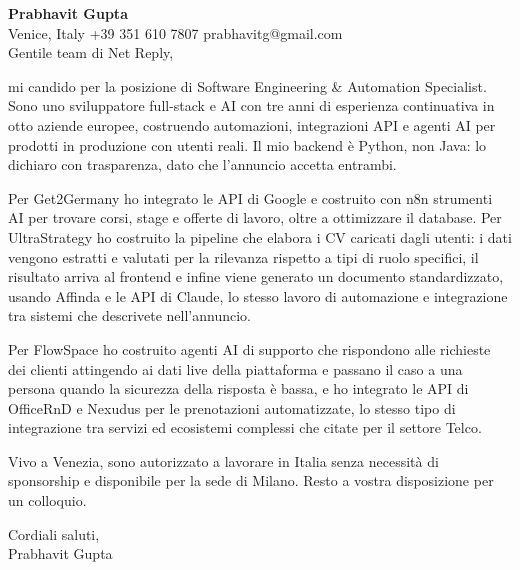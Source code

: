\documentclass[a4paper,10.5pt]{article}
\begin{document}
\textbf{Prabhavit Gupta}\\
Venice, Italy \textbar{} +39 351 610 7807 \textbar{} prabhavitg@gmail.com\\[10pt]
Gentile team di Net Reply,

mi candido per la posizione di Software Engineering \& Automation Specialist. Sono uno sviluppatore full-stack e AI con tre anni di esperienza continuativa in otto aziende europee, costruendo automazioni, integrazioni API e agenti AI per prodotti in produzione con utenti reali. Il mio backend è Python, non Java: lo dichiaro con trasparenza, dato che l'annuncio accetta entrambi.

Per Get2Germany ho integrato le API di Google e costruito con n8n strumenti AI per trovare corsi, stage e offerte di lavoro, oltre a ottimizzare il database. Per UltraStrategy ho costruito la pipeline che elabora i CV caricati dagli utenti: i dati vengono estratti e valutati per la rilevanza rispetto a tipi di ruolo specifici, il risultato arriva al frontend e infine viene generato un documento standardizzato, usando Affinda e le API di Claude, lo stesso lavoro di automazione e integrazione tra sistemi che descrivete nell'annuncio.

Per FlowSpace ho costruito agenti AI di supporto che rispondono alle richieste dei clienti attingendo ai dati live della piattaforma e passano il caso a una persona quando la sicurezza della risposta è bassa, e ho integrato le API di OfficeRnD e Nexudus per le prenotazioni automatizzate, lo stesso tipo di integrazione tra servizi ed ecosistemi complessi che citate per il settore Telco.

Vivo a Venezia, sono autorizzato a lavorare in Italia senza necessità di sponsorship e disponibile per la sede di Milano. Resto a vostra disposizione per un colloquio.

Cordiali saluti,\\
Prabhavit Gupta
\end{document}
